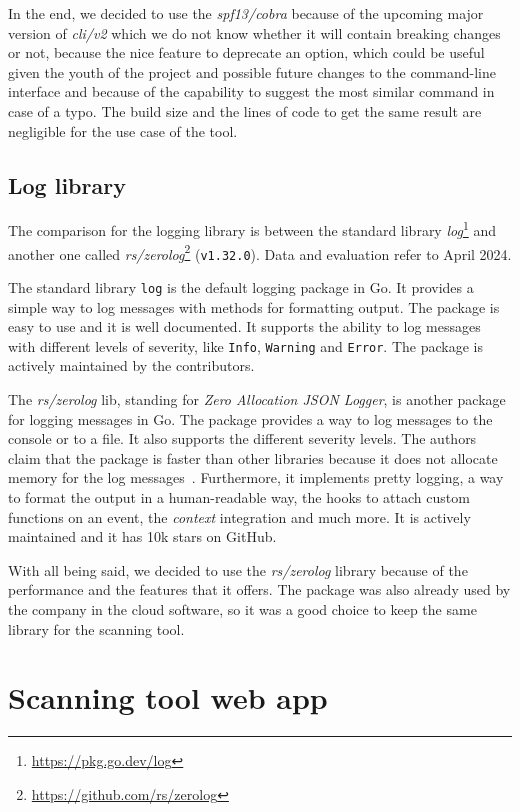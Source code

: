 In the end, we decided to use the \textit{spf13/cobra} because of the upcoming major version of \textit{cli/v2} which we do not know whether it will contain breaking changes or not, because the nice feature to deprecate an option, which could be useful given the youth of the project and possible future changes to the command-line interface and because of the capability to suggest the most similar command in case of a typo. The build size and the lines of code to get the same result are negligible for the use case of the tool.

\subsection{Log library}

The comparison for the logging library is between the standard library \textit{log}\footnote{\url{https://pkg.go.dev/log}} and another one called \textit{rs/zerolog}\footnote{\url{https://github.com/rs/zerolog}} (\texttt{v1.32.0}). Data and evaluation refer to April 2024.

The standard library \texttt{log} is the default logging package in Go. It provides a simple way to log messages with methods for formatting output. The package is easy to use and it is well documented. It supports the ability to log messages with different levels of severity, like \texttt{Info}, \texttt{Warning} and \texttt{Error}. The package is actively maintained by the contributors.

The \textit{rs/zerolog} lib, standing for \textit{Zero Allocation JSON Logger}, is another package for logging messages in Go. The package provides a way to log messages to the console or to a file. It also supports the different severity levels. The authors claim that the package is faster than other libraries because it does not allocate memory for the log messages~\cite{go-zerolog-benchmarks}. Furthermore, it implements pretty logging, a way to format the output in a human-readable way, the hooks to attach custom functions on an event, the \textit{context} integration and much more. It is actively maintained and it has 10k stars on GitHub.

With all being said, we decided to use the \textit{rs/zerolog} library because of the performance and the features that it offers. The package was also already used by the company in the cloud software, so it was a good choice to keep the same library for the scanning tool.

\section{Scanning tool web app}

